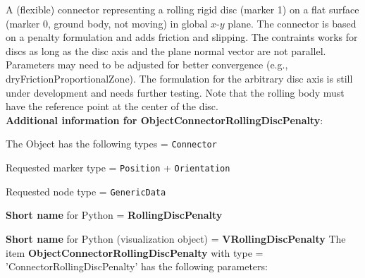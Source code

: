 \label{sec:item:ObjectConnectorRollingDiscPenalty}
A (flexible) connector representing a rolling rigid disc (marker 1) on a flat surface (marker 0, ground body, not moving) in global $x$-$y$ plane. The connector is based on a penalty formulation and adds friction and slipping. The contraints works for discs as long as the disc axis and the plane normal vector are not parallel. Parameters may need to be adjusted for better convergence (e.g., dryFrictionProportionalZone). The formulation for the arbitrary disc axis is still under development and needs further testing. Note that the rolling body must have the reference point at the center of the disc.\vspace{12pt}
 \\{\bf Additional information for ObjectConnectorRollingDiscPenalty}:
\bi
  \item The Object has the following types = \texttt{Connector}
  \item Requested marker type = \texttt{Position} + \texttt{Orientation}
  \item Requested node type = \texttt{GenericData}
  \item {\bf Short name} for Python = {\bf RollingDiscPenalty}  \item {\bf Short name} for Python (visualization object) = {\bf VRollingDiscPenalty}\ei
\vspace{12pt} \noindent The item {\bf ObjectConnectorRollingDiscPenalty} with type = 'ConnectorRollingDiscPenalty' has the following parameters:\vspace{-1cm}\\ 
